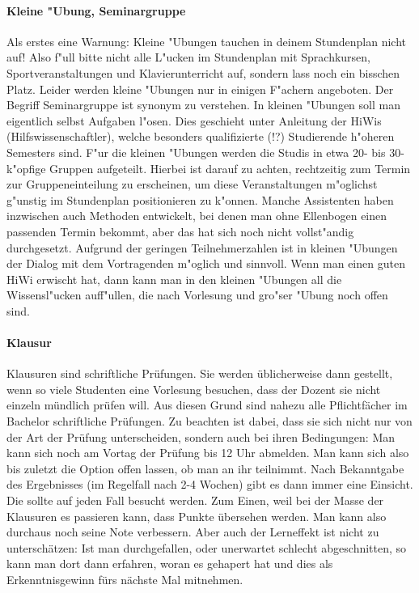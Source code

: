 \paragraph*{Kleine "Ubung, Seminargruppe}

Als erstes eine Warnung: Kleine "Ubungen tauchen in deinem Stundenplan nicht auf!
Also f"ull bitte nicht alle L"ucken im
Stundenplan mit Sprachkursen, Sportveranstaltungen und Klavierunterricht auf,
sondern lass noch ein bisschen Platz. Leider werden kleine "Ubungen nur in
einigen F"achern angeboten. Der Begriff Seminargruppe ist synonym zu verstehen.
In kleinen "Ubungen soll man eigentlich selbst Aufgaben l"osen. Dies geschieht
unter Anleitung der HiWis (Hilfswissenschaftler), welche besonders qualifizierte
(!?) Studierende h"oheren Semesters sind. F"ur die kleinen "Ubungen werden die
Studis in etwa 20- bis 30-k"opfige Gruppen aufgeteilt. Hierbei ist darauf zu
achten, rechtzeitig zum Termin zur Gruppeneinteilung zu erscheinen, um diese
Veranstaltungen m"oglichst g"unstig im Stundenplan positionieren zu k"onnen.
Manche Assistenten haben inzwischen auch Methoden entwickelt, bei denen man
ohne Ellenbogen einen passenden Termin bekommt, aber das hat sich noch nicht
vollst"andig durchgesetzt. Aufgrund der geringen Teilnehmerzahlen ist in
kleinen "Ubungen der Dialog mit dem Vortragenden m"oglich und sinnvoll. Wenn
man einen guten HiWi erwischt hat, dann kann man in den kleinen "Ubungen all
die Wissensl"ucken auff"ullen, die nach Vorlesung und gro"ser "Ubung noch offen
sind.
\paragraph*{Klausur}
Klausuren sind schriftliche Prüfungen. Sie werden üblicherweise dann
gestellt, wenn so viele Studenten eine Vorlesung besuchen, dass der
Dozent sie nicht einzeln mündlich prüfen will. Aus diesen Grund sind nahezu
alle Pflichtfächer im Bachelor schriftliche Prüfungen. Zu beachten ist
dabei, dass sie sich nicht nur von der Art der Prüfung unterscheiden,
sondern auch bei ihren Bedingungen: Man kann sich noch am Vortag der
Prüfung bis 12 Uhr abmelden. Man kann sich also bis zuletzt die Option
offen lassen, ob man an ihr teilnimmt. Nach Bekanntgabe des
Ergebnisses (im Regelfall nach 2-4 Wochen) gibt es dann immer eine
Einsicht. Die sollte auf jeden Fall besucht werden. Zum Einen, weil
bei der Masse der Klausuren es passieren kann, dass Punkte übersehen
werden. Man kann also durchaus noch seine Note verbessern. Aber auch
der Lerneffekt ist nicht zu unterschätzen: Ist man durchgefallen, oder
unerwartet schlecht abgeschnitten, so kann man dort dann erfahren,
woran es gehapert hat und dies als Erkenntnisgewinn fürs nächste Mal mitnehmen.

